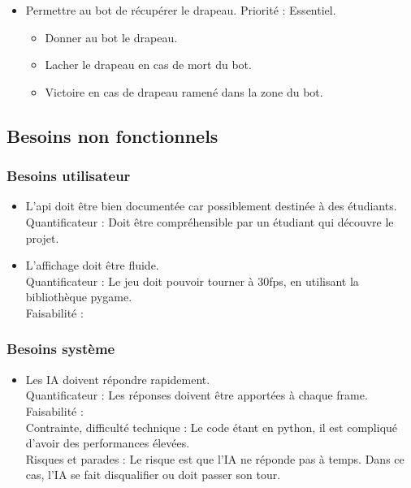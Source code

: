\documentclass[french]{article}
\begin{document}
\begin{itemize}
        \item Permettre au bot de récupérer le drapeau.
            Priorité : Essentiel.
            \begin{itemize}
                \item Donner au bot le drapeau.
                \item Lacher le drapeau en cas de mort du bot.
                \item Victoire en cas de drapeau ramené dans la zone du bot.
            \end{itemize}
    \end{itemize}


\subsection{Besoins non fonctionnels}
\subsubsection{Besoins utilisateur}
    \begin{itemize}
        \item L'api doit être bien documentée car possiblement destinée à des étudiants.\\
            Quantificateur : Doit être compréhensible par un étudiant qui découvre le projet. \\

        \item L'affichage doit être fluide.\\
            Quantificateur : Le jeu doit pouvoir tourner à 30fps, en utilisant la bibliothèque pygame.\\
            Faisabilité : \\ %


    \end{itemize}
\subsubsection{Besoins système}
    \begin{itemize}

        \item Les IA doivent répondre rapidement.\\
            Quantificateur : Les réponses doivent être apportées à chaque frame.\\
            Faisabilité : \\
            Contrainte, difficulté technique : Le code étant en python, il est compliqué d'avoir des performances élevées.\\
            Risques et parades : Le risque est que l'IA ne réponde pas à temps. Dans ce cas, l'IA se fait disqualifier ou doit passer son tour.\\
    \end{itemize}
\end{document}
